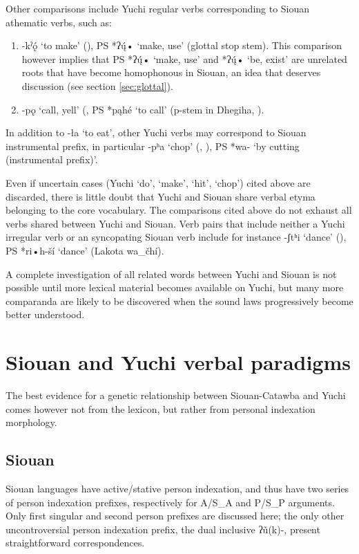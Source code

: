 \documentclass[oneside,a4paper,11pt]{article}
\newcommand{\ipa}[1]{{\phon#1}} %
\begin{document}
Other comparisons include Yuchi regular verbs corresponding to Siouan athematic verbs, such as:
\begin{enumerate}
\item   \ipa{-kˀǫ́} ‘to make’ (\citealt[364]{wagner38yuchi}), PS *\ipa{*ʔų́•} ‘make, use’ (glottal stop stem). This comparison however implies that PS *\ipa{*ʔų́•} ‘make, use’ and *\ipa{ʔų́•} `be, exist' are unrelated roots that have become homophonous in Siouan, an idea that deserves discussion (see section \ref{sec:glottal}).
\item \ipa{-pǫ} ‘call, yell’ (\citealt[320, 328]{wagner38yuchi}, PS *\ipa{pąhé} ‘to call’ (p-stem in Dhegiha, \citealt{rankin05quapaw}).   
\end{enumerate}  



In addition to \ipa{-ła} ‘to eat’, other Yuchi verbs may correspond to Siouan instrumental prefix, in particular  \ipa{-pʰa} `chop' (\citealt[329]{wagner38yuchi}, \citealt[176]{crawford73yuchi}), PS *\ipa{wa-} `by cutting (instrumental prefix)'.

Even if uncertain cases (Yuchi `do', `make', `hit', `chop') cited above are discarded, there is little doubt that Yuchi and Siouan share verbal etyma belonging to the core vocabulary. The comparisons cited above do not exhaust all verbs shared between Yuchi and Siouan. Verb pairs that include neither a Yuchi irregular verb or an syncopating Siouan verb include for instance \ipa{-ʃtʰi} `dance' (\citealt[354]{wagner38yuchi}), PS *\ipa{*ri•h-ší} `dance' (Lakota \ipa{wa\_čhí}).

A complete investigation of all related words between Yuchi and Siouan is not possible until more lexical material becomes available on Yuchi, but many more comparanda are likely to be discovered when the sound laws progressively become better understood.  

\section{Siouan and Yuchi verbal paradigms}
The best evidence for a genetic relationship between Siouan-Catawba and Yuchi comes however not from the lexicon, but rather from personal indexation morphology. 

\subsection{Siouan}
Siouan languages have active/stative person indexation, and thus have two series of person indexation prefixes, respectively for A/S_A and P/S_P arguments. Only first singular and second person prefixes are discussed here; the only other uncontroversial person indexation prefix, the dual inclusive \ipa{*ʔũ(k)-}, present straightforward correspondences.
\end{document}
